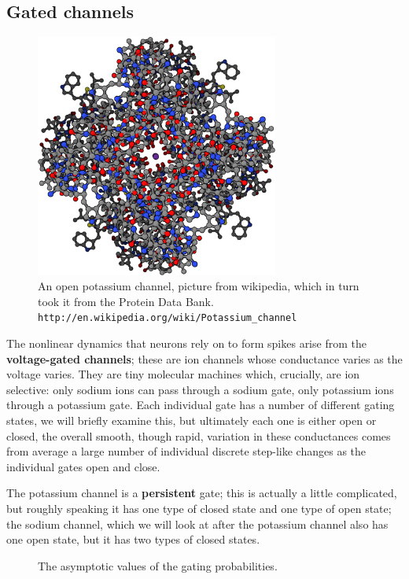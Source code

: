 \documentclass[12pt]{article}
\begin{document}
\subsection*{Gated channels}

\begin{figure}
\begin{center}
\includegraphics[width=8cm]{potassium_channel.png}
\end{center}
\caption{An open potassium channel, picture from  wikipedia, which in turn took it from the Protein Data Bank. \texttt{http://en.wikipedia.org/wiki/Potassium\_channel}}
\end{figure}

The nonlinear dynamics that neurons rely on to form spikes arise from
the \textbf{voltage-gated channels}; these are ion channels whose
conductance varies as the voltage varies. They are tiny molecular
machines which, crucially, are ion selective: only sodium ions can
pass through a sodium gate, only potassium ions through a potassium
gate. Each individual gate has a number of different gating states, we
will briefly examine this, but ultimately each one is either open or
closed, the overall smooth, though rapid, variation in these
conductances comes from average a large number of individual discrete
step-like changes as the individual gates open and close.

The potassium channel is a \textbf{persistent} gate; this is actually
a little complicated, but roughly speaking it has one type of closed
state and one type of open state; the sodium channel, which we will
look at after the potassium channel also has one open state, but it
has two types of closed states. 

\begin{figure}
\begin{center}

\end{center}
\caption{The asymptotic values of the gating probabilities.\label{fig:asymp_vals}}
\end{figure}
\end{document}
